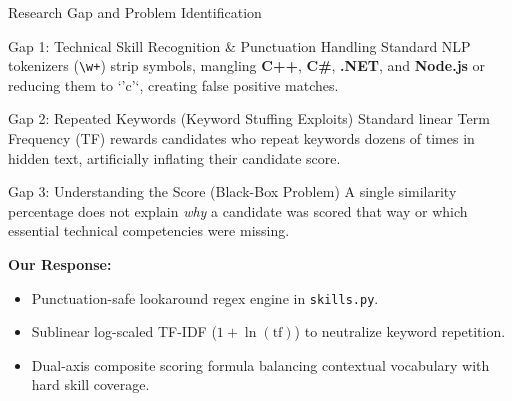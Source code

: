 \documentclass[aspectratio=169, 10pt]{beamer}
\begin{document}
\begin{frame}{Research Gap and Problem Identification}
  \begin{block}{Gap 1: Technical Skill Recognition \& Punctuation Handling}
    Standard NLP tokenizers (\texttt{\textbackslash w+}) strip symbols, mangling \textbf{C++}, \textbf{C\#}, \textbf{.NET}, and \textbf{Node.js} or reducing them to `'c'`, creating false positive matches.
  \end{block}

  \begin{block}{Gap 2: Repeated Keywords (Keyword Stuffing Exploits)}
    Standard linear Term Frequency (TF) rewards candidates who repeat keywords dozens of times in hidden text, artificially inflating their candidate score.
  \end{block}

  \begin{block}{Gap 3: Understanding the Score (Black-Box Problem)}
    A single similarity percentage does not explain \textit{why} a candidate was scored that way or which essential technical competencies were missing.
  \end{block}

  \vspace{0.1cm}
  \textbf{Our Response:}
  \begin{itemize}
    \item Punctuation-safe lookaround regex engine in \texttt{skills.py}.
    \item Sublinear log-scaled TF-IDF ($1 + \ln(\text{tf})$) to neutralize keyword repetition.
    \item Dual-axis composite scoring formula balancing contextual vocabulary with hard skill coverage.
  \end{itemize}
\end{frame}
\end{document}
